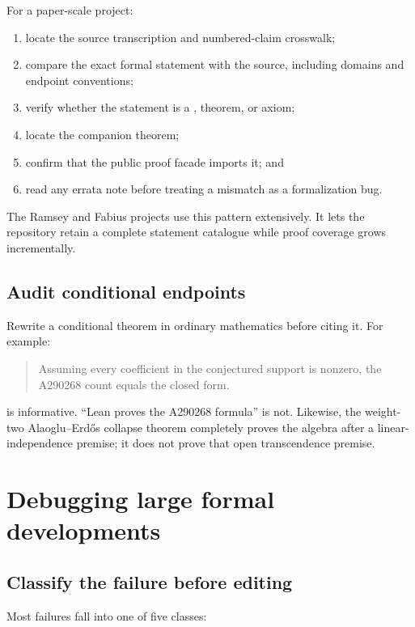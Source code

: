 \documentclass[
  10pt,
  a4paper,
  twoside,
  open=any,
  parskip=half,
  headings=big
]{scrreprt}
\newcommand{\code}[1]{\texttt{\detokenize{#1}}}
\begin{document}
For a paper-scale project:

\begin{enumerate}
  \item locate the source transcription and numbered-claim crosswalk;
  \item compare the exact formal statement with the source, including domains and endpoint conventions;
  \item verify whether the statement is a \code{def ... : Prop}, theorem, or axiom;
  \item locate the companion \code{..._holds} theorem;
  \item confirm that the public proof facade imports it; and
  \item read any errata note before treating a mismatch as a formalization bug.
\end{enumerate}

The Ramsey and Fabius projects use this pattern extensively. It lets the repository retain a complete statement catalogue while proof coverage grows incrementally.

\section{Audit conditional endpoints}

Rewrite a conditional theorem in ordinary mathematics before citing it. For example:

\begin{quote}
Assuming every coefficient in the conjectured support is nonzero, the A290268 count equals the closed form.
\end{quote}

is informative. ``Lean proves the A290268 formula'' is not. Likewise, the weight-two Alaoglu--Erd\H{o}s collapse theorem completely proves the algebra after a linear-independence premise; it does not prove that open transcendence premise.

\chapter{Debugging large formal developments}
\label{ch:debugging}

\section{Classify the failure before editing}

Most failures fall into one of five classes:
\end{document}
